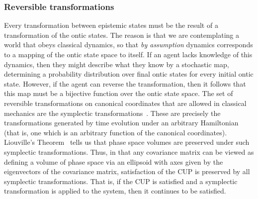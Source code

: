 \documentclass[pra,superscriptaddress,nofootinbib,12pt]{revtex4-2}
\begin{document}


\subsubsection{Reversible transformations}
\label{sec:Reversible}

Every transformation between epistemic states must be the result of a transformation of the ontic states. The reason is that we are contemplating a world that obeys classical dynamics, so that \emph{by assumption} dynamics corresponds to a mapping of the ontic state space to itself.  If an agent lacks knowledge of this dynamics, then they might describe what they know by a stochastic map, determining a probability distribution over final ontic states for every initial ontic state.  However, if the agent can reverse the transformation, then it follows that this map must be a bijective function over the ontic state space.  The set of reversible transformations on canonical coordinates that are allowed in classical mechanics are the symplectic transformations~\cite{Arn97}.  These are precisely the transformations generated by time evolution under an arbitrary Hamiltonian (that is, one which is an arbitrary function of the canonical coordinates).  Liouville's Theorem~\cite{Arn97} tells us that phase space volumes are preserved under such symplectic transformations.  Thus, in that any covariance matrix can be viewed as defining a volume of phase space via an ellipsoid with axes given by the eigenvectors of the covariance matrix, satisfaction of the CUP is preserved by all symplectic transformations.  That is, if the CUP is satisfied and a symplectic transformation is applied to the system, then it continues to be satisfied.
\end{document}
